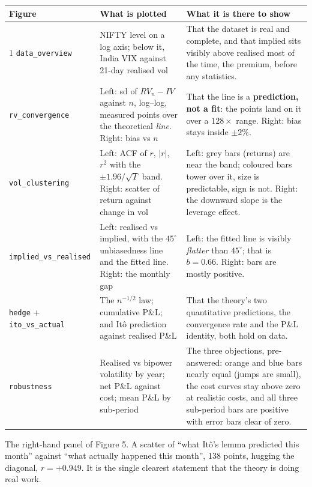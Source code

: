 \documentclass[11pt,a4paper]{article}
\begin{document}
\begin{table}[H]
\centering\small
\begin{tabular}{L{2.6cm}L{6.2cm}L{6.1cm}}
\toprule
\textbf{Figure} & \textbf{What is plotted} & \textbf{What it is there to show} \\
 \texttt{data\_overview} & NIFTY level on a log axis; below it, India VIX against 21-day
realised vol & That the dataset is real and complete, and that implied sits visibly above
realised most of the time, the premium, before any statistics. \\
 \texttt{rv\_convergence} & Left: sd of $RV_n-IV$ against $n$, log--log, measured points over
the theoretical \emph{line}. Right: bias vs $n$ & That the line is a \textbf{prediction, not a
fit}: the points land on it over a $128\times$ range. Right: bias stays inside $\pm2\%$. \\
 \texttt{vol\_clustering} & Left: ACF of $r$, $|r|$, $r^2$ with the $\pm1.96/\sqrt T$ band.
Right: scatter of return against change in vol & Left: grey bars (returns) are near the band;
coloured bars tower over it, size is predictable, sign is not. Right: the downward slope is
the leverage effect. \\
 \texttt{implied\_vs\_realised} & Left: realised vs implied, with the $45^\circ$ unbiasedness
line and the fitted line. Right: the monthly gap & Left: the fitted line is visibly
\emph{flatter} than $45^\circ$; that is $b=0.66$. Right: bars are mostly positive. \\
 \texttt{hedge} + \texttt{ito\_vs\_actual} & The $n^{-1/2}$ law; cumulative P\&L; and It\^o
prediction against realised P\&L & That the theory's two quantitative predictions, the
convergence rate and the P\&L identity, both hold on data. \\
 \texttt{robustness} & Realised vs bipower volatility by year; net P\&L against cost; mean
P\&L by sub-period & The three objections, pre-answered: orange and blue bars nearly equal
(jumps are small), the cost curves stay above zero at realistic costs, and all three
sub-period bars are positive with error bars clear of zero. \\
\bottomrule
\end{tabular}
\end{table}

\begin{saybox}
The right-hand panel of Figure 5. A scatter of ``what It\^o's lemma predicted this month'' against
``what actually happened this month'', 138 points, hugging the diagonal, $r=+0.949$. It is the
single clearest statement that the theory is doing real work.
\end{saybox}
\end{document}
